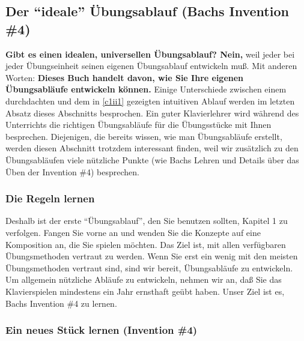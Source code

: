 
\subsection{Der \enquote{ideale} Übungsablauf (Bachs Invention \#4)}
\label{c1iii19}

\textbf{Gibt es einen idealen, universellen Übungsablauf?
Nein,} weil jeder bei jeder Übungseinheit seinen eigenen Übungsablauf entwickeln muß.
Mit anderen Worten: \textbf{Dieses Buch handelt davon, wie Sie Ihre eigenen Übungsabläufe entwickeln können.}
Einige Unterschiede zwischen einem durchdachten und dem in \hyperref[c1ii1]{\autoref{c1ii1}} gezeigten intuitiven Ablauf werden im letzten Absatz dieses Abschnitts besprochen.
Ein guter Klavierlehrer wird während des Unterrichts die richtigen Übungsabläufe für die Übungsstücke mit Ihnen besprechen.
Diejenigen, die bereits wissen, wie man Übungsabläufe erstellt, werden diesen Abschnitt trotzdem interessant finden, weil wir zusätzlich zu den Übungsabläufen viele nützliche Punkte (wie Bachs Lehren und Details über das Üben der Invention \#4) besprechen.


\subsubsection{Die Regeln lernen}
\label{c1iii19a}

Deshalb ist der erste \enquote{Übungsablauf}, den Sie benutzen sollten, Kapitel 1 zu verfolgen.
Fangen Sie vorne an und wenden Sie die Konzepte auf eine Komposition an, die Sie spielen möchten.
Das Ziel ist, mit allen verfügbaren Übungsmethoden vertraut zu werden.
Wenn Sie erst ein wenig mit den meisten Übungsmethoden vertraut sind, sind wir bereit, Übungsabläufe zu entwickeln.
Um allgemein nützliche Abläufe zu entwickeln, nehmen wir an, daß Sie das Klavierspielen mindestens ein Jahr ernsthaft geübt haben.
Unser Ziel ist es, Bachs Invention \#4 zu lernen.


\subsubsection{Ein neues Stück lernen (Invention \#4)}
\label{c1iii19b}

